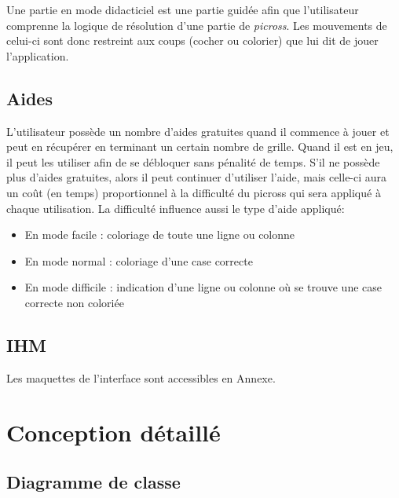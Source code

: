 \documentclass{report}
\begin{document}
	Une partie en mode didacticiel est une partie guidée afin que l'utilisateur comprenne la logique de résolution d'une partie de \textit{picross}. Les mouvements de celui-ci sont donc restreint aux coups (cocher ou colorier) que lui dit de jouer l'application.
	
  \section{Aides}

  L'utilisateur possède un nombre d'aides gratuites quand il commence à jouer et peut en récupérer en terminant un certain nombre de grille. Quand il est en jeu, il peut les utiliser afin de se débloquer sans pénalité de temps. S'il ne possède plus d'aides gratuites, alors il peut continuer d'utiliser l'aide, mais celle-ci aura un coût (en temps) proportionnel à la difficulté du picross qui sera appliqué à chaque utilisation. La difficulté influence aussi le type d'aide appliqué:
    \begin{itemize}
    \item En mode facile : coloriage de toute une ligne ou colonne
    \item En mode normal : coloriage d'une case correcte 
    \item En mode difficile : indication d'une ligne ou colonne où se trouve une case correcte non coloriée
    \end{itemize}


  \section{IHM}
  
  Les maquettes de l'interface sont accessibles en Annexe.
  
  
			
\chapter{Conception détaillé}

    \section{Diagramme de classe}
    
\end{document}
